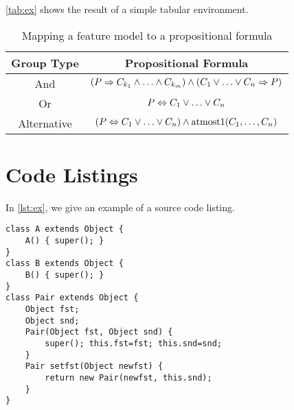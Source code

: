 \vref{tab:ex} shows the result of a simple tabular environment.

\begin{table}[htbp]
	\centering
		\begin{tabular}{cc}\toprule
			Group Type & Propositional Formula\\\midrule
			And & $(P \Rightarrow C_{k_1} \wedge\ldots\wedge C_{k_m}) \wedge (C_1\vee\ldots\vee C_n \Rightarrow P)$\\\addlinespace
			Or & $P \Leftrightarrow C_1\vee\ldots\vee C_n$\\\addlinespace
			Alternative & $(P \Leftrightarrow C_1\vee\ldots\vee C_n) \wedge \mbox{atmost}1(C_1,\ldots,C_n)$\\
			\bottomrule
		\end{tabular}
	\caption{Mapping a feature model to a propositional formula}
	\label{tab:ex}
\end{table}

\section{Code Listings}

In \vref{lst:ex}, we give an example of a source code listing. 

\begin{lstlisting}[style=Java,float=htb,caption={Java source code},label={lst:ex}]
class A extends Object {
	A() { super(); }
}
class B extends Object {
	B() { super(); }
}
class Pair extends Object {
	Object fst;
	Object snd;
	Pair(Object fst, Object snd) {
		super(); this.fst=fst; this.snd=snd;
	}
	Pair setfst(Object newfst) {
		return new Pair(newfst, this.snd);
	}
}
\end{lstlisting}
